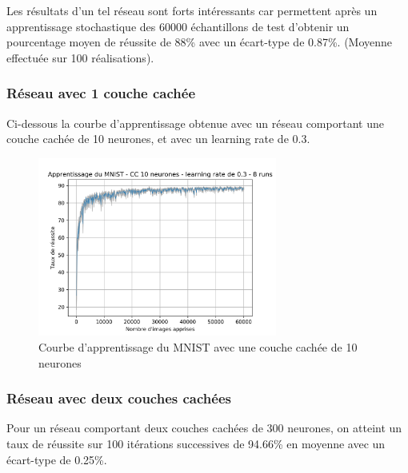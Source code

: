 \medskip

Les résultats d'un tel réseau sont forts intéressants car permettent après un
apprentissage stochastique des 60000 échantillons de test d'obtenir un
pourcentage moyen de réussite de 88\% avec un écart-type de 0.87\%.
(Moyenne effectuée sur 100 réalisations).

\subsubsection{Réseau avec 1 couche cachée}

Ci-dessous la courbe d'apprentissage obtenue avec un réseau comportant une couche
cachée de 10 neurones, et avec un learning rate de 0.3.

\begin{figure}[!ht]
\begin{center}
  \includegraphics[width=0.7\textwidth]{images/mnist-256-10-03.png}
\end{center}
\caption{Courbe d'apprentissage du MNIST avec une couche cachée de 10 neurones}
\end{figure}

\subsubsection{Réseau avec deux couches cachées}

Pour un réseau comportant deux couches cachées de 300 neurones, on atteint un taux
de réussite sur 100 itérations successives de 94.66\% en moyenne avec un écart-type de 0.25\%.
